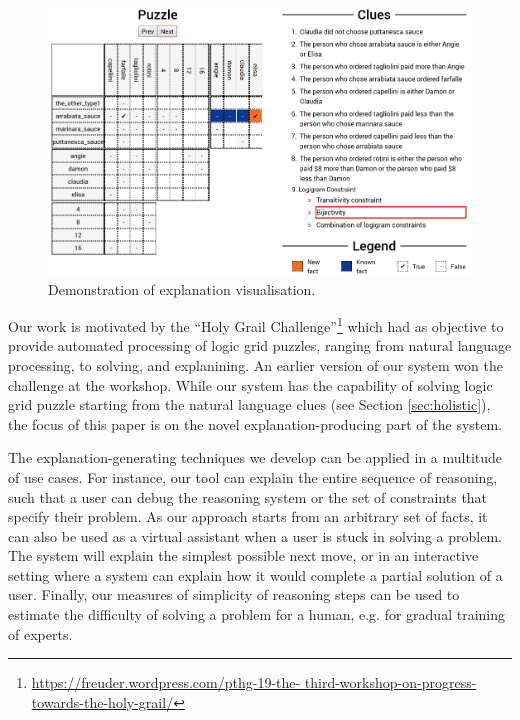 \begin{figure}[ht]
\centering
\includegraphics[width=\linewidth]{zebra_screen}
\caption{Demonstration of explanation visualisation.}
\label{fig:zebrascreen}
\end{figure}

Our work is motivated by the ``Holy Grail Challenge''\footnote{\tiny \url{https://freuder.wordpress.com/pthg-19-the- third-workshop-on-progress-towards-the-holy-grail/}} which had as objective to provide automated processing of logic grid puzzles, ranging from natural language processing, to solving, and explanining. 
An earlier version of our system won the challenge at the workshop. 
While our system has the capability of solving logic grid puzzle starting from the natural language clues (see Section \ref{sec:holistic}), the focus of this paper is on the novel explanation-producing part of the system.

The explanation-generating techniques we develop can be applied in a multitude of use cases. 
For instance, our tool can explain the entire sequence of reasoning, such that a user can debug the reasoning system or the set of constraints that specify their problem. 
As our approach starts from an arbitrary set of facts, it can also be used as a virtual assistant when a user is stuck in solving a problem.
The system will explain the simplest possible next move, or in an interactive setting where a system can explain how it would complete a partial solution of a user.
Finally, our measures of simplicity of reasoning steps can be used to estimate the difficulty of solving a problem for a human, e.g. for gradual training of experts.\\

